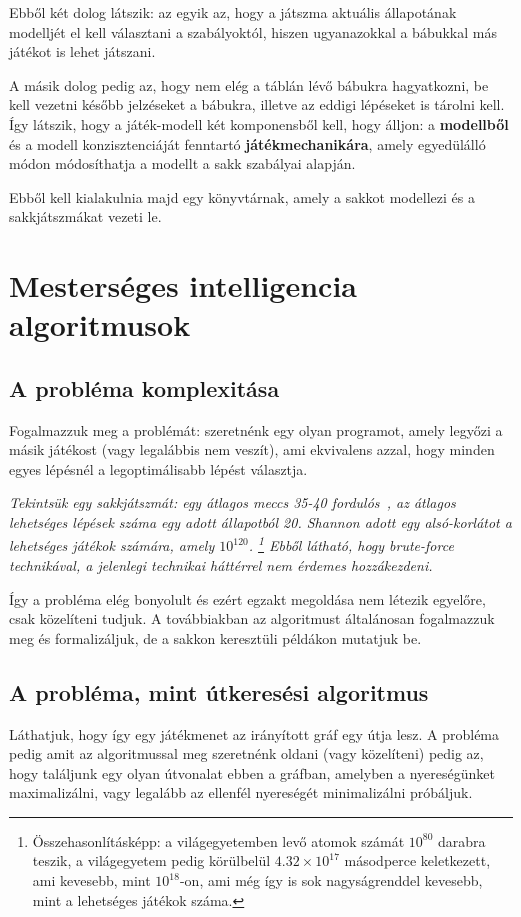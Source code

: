 \documentclass[twoside, a4paper, 12pt]{book}
\begin{document}
Ebből két dolog látszik: az egyik az, hogy a játszma aktuális állapotának modelljét el kell választani a szabályoktól, hiszen ugyanazokkal a bábukkal más játékot is lehet játszani.

A másik dolog pedig az, hogy nem elég a táblán lévő bábukra hagyatkozni, be kell vezetni később jelzéseket a bábukra, illetve az eddigi lépéseket is tárolni kell. Így látszik, hogy a játék-modell két komponensből kell, hogy álljon: a \textbf{modellből} és a modell konzisztenciáját fenntartó \textbf{játékmechanikára}, amely egyedülálló módon módosíthatja a modellt a sakk szabályai alapján.

Ebből kell kialakulnia majd egy könyvtárnak, amely a sakkot modellezi és a sakkjátszmákat vezeti le.

\section{Mesterséges intelligencia algoritmusok}
\subsection{A probléma komplexitása}
Fogalmazzuk meg a problémát: szeretnénk egy olyan programot, amely legyőzi a másik játékost (vagy legalábbis nem veszít), ami ekvivalens azzal, hogy minden egyes lépésnél a legoptimálisabb lépést választja.

\textit{Tekintsük egy sakkjátszmát: egy átlagos meccs 35-40 fordulós~\cite{averageLengthOfChessGame}\cite{averageLengthOfChessGame2}\cite{chessStatistics}, az átlagos lehetséges lépések száma egy adott állapotból 20\cite{shannonnumber}. Shannon adott egy alsó-korlátot a lehetséges játékok számára, amely $10^{120}$. \footnote{Összehasonlításképp: a világegyetemben levő atomok számát $10^{80}$ darabra teszik, a világegyetem pedig körülbelül $4.32 \times 10^{17}$ másodperce keletkezett, ami kevesebb, mint $10^{18}$-on, ami még így is sok nagyságrenddel kevesebb, mint a lehetséges játékok száma.} Ebből látható, hogy \textit{brute-force} technikával, a jelenlegi technikai háttérrel nem érdemes hozzákezdeni.}

Így a probléma elég bonyolult és ezért egzakt megoldása nem létezik egyelőre, csak közelíteni tudjuk. A továbbiakban az algoritmust általánosan fogalmazzuk meg és formalizáljuk, de a sakkon keresztüli példákon mutatjuk be.

\subsection{A probléma, mint útkeresési algoritmus}
Láthatjuk, hogy így egy játékmenet az irányított gráf egy útja lesz. A probléma pedig amit az algoritmussal meg szeretnénk oldani (vagy közelíteni) pedig az, hogy találjunk egy olyan útvonalat ebben a gráfban, amelyben a nyereségünket maximalizálni, vagy legalább az ellenfél nyereségét minimalizálni próbáljuk.
\end{document}
